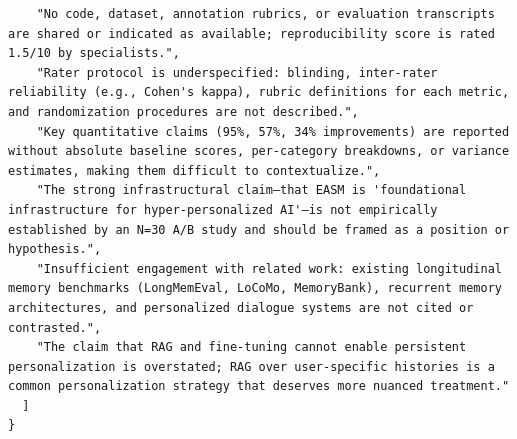 \documentclass[11pt]{article}
\begin{document}
\begin{verbatim}
    "No code, dataset, annotation rubrics, or evaluation transcripts are shared or indicated as available; reproducibility score is rated 1.5/10 by specialists.",
    "Rater protocol is underspecified: blinding, inter-rater reliability (e.g., Cohen's kappa), rubric definitions for each metric, and randomization procedures are not described.",
    "Key quantitative claims (95%, 57%, 34% improvements) are reported without absolute baseline scores, per-category breakdowns, or variance estimates, making them difficult to contextualize.",
    "The strong infrastructural claim—that EASM is 'foundational infrastructure for hyper-personalized AI'—is not empirically established by an N=30 A/B study and should be framed as a position or hypothesis.",
    "Insufficient engagement with related work: existing longitudinal memory benchmarks (LongMemEval, LoCoMo, MemoryBank), recurrent memory architectures, and personalized dialogue systems are not cited or contrasted.",
    "The claim that RAG and fine-tuning cannot enable persistent personalization is overstated; RAG over user-specific histories is a common personalization strategy that deserves more nuanced treatment."
  ]
}
\end{verbatim}
\end{document}
